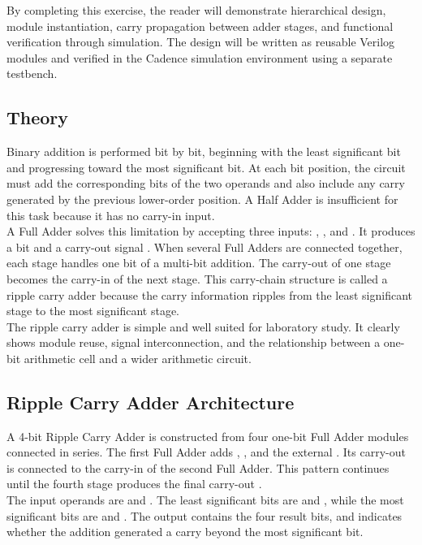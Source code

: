 \noindent By completing this exercise, the reader will demonstrate hierarchical design, module
instantiation, carry propagation between adder stages, and functional verification through
simulation. The design will be written as reusable Verilog modules and verified in the Cadence
simulation environment using a separate testbench.

\subsection{Theory}
Binary addition is performed bit by bit, beginning with the least significant bit and progressing
toward the most significant bit. At each bit position, the circuit must add the corresponding bits
of the two operands and also include any carry generated by the previous lower-order position. A
Half Adder is insufficient for this task because it has no carry-in input.\\

\noindent A Full Adder solves this limitation by accepting three inputs: ,
, and . It produces a  bit and a carry-out signal
. When several Full Adders are connected together, each stage handles one bit of a
multi-bit addition. The carry-out of one stage becomes the carry-in of the next stage. This
carry-chain structure is called a ripple carry adder because the carry information ripples from the
least significant stage to the most significant stage.\\

\noindent The ripple carry adder is simple and well suited for laboratory study. It clearly shows
module reuse, signal interconnection, and the relationship between a one-bit arithmetic cell and a
wider arithmetic circuit.

\subsection{Ripple Carry Adder Architecture}
A 4-bit Ripple Carry Adder is constructed from four one-bit Full Adder modules connected in series.
The first Full Adder adds , , and the external
. Its carry-out is connected to the carry-in of the second Full Adder. This pattern
continues until the fourth stage produces the final carry-out .\\

\noindent The input operands are  and . The least significant
bits are  and , while the most significant bits are
 and . The output  contains the four result
bits, and  indicates whether the addition generated a carry beyond the most
significant bit.

